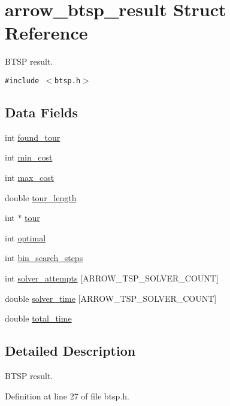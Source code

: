 \hypertarget{structarrow__btsp__result}{
\section{arrow\_\-btsp\_\-result Struct Reference}
\label{structarrow__btsp__result}
}
BTSP result.  


{\tt \#include $<$btsp.h$>$}

\subsection*{Data Fields}
\begin{CompactItemize}
\item 
int \hyperlink{structarrow__btsp__result_6ba21b4231cfe2c1e437a9f7e8f31aa6}{found\_\-tour}
\item 
int \hyperlink{structarrow__btsp__result_8c80e92a356cdd42d176a3947fcc5665}{min\_\-cost}
\item 
int \hyperlink{structarrow__btsp__result_06f661dc0e63cb5fd1888303b3ec626f}{max\_\-cost}
\item 
double \hyperlink{structarrow__btsp__result_3c0b8827a873df71166e7fe9419c45c2}{tour\_\-length}
\item 
int $\ast$ \hyperlink{structarrow__btsp__result_ebd9a553dc3bf31f52eda0b293b0e272}{tour}
\item 
int \hyperlink{structarrow__btsp__result_febcf61e24bf277eeb7795c18bd42b8b}{optimal}
\item 
int \hyperlink{structarrow__btsp__result_80106c5f0b8f82353ad6771ad9eaac71}{bin\_\-search\_\-steps}
\item 
int \hyperlink{structarrow__btsp__result_b1d423ab6eda81de4c3bde1685976593}{solver\_\-attempts} \mbox{[}ARROW\_\-TSP\_\-SOLVER\_\-COUNT\mbox{]}
\item 
double \hyperlink{structarrow__btsp__result_f13227603570821a0ba7d6466f39f00c}{solver\_\-time} \mbox{[}ARROW\_\-TSP\_\-SOLVER\_\-COUNT\mbox{]}
\item 
double \hyperlink{structarrow__btsp__result_dea5711f0a574d98f66d1b20011a68de}{total\_\-time}
\end{CompactItemize}


\subsection{Detailed Description}
BTSP result. 

Definition at line 27 of file btsp.h.

